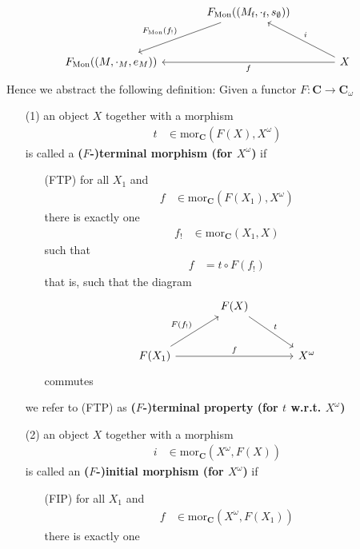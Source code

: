\[
\begin{tikzcd}[sep=large]
  &
  F_{\textrm{Mon}}((M_{\textrm{f}},\cdot_{\textrm{f}},s_{\emptyset}))
  \arrow[swap]{dl}{F_{\textrm{Mon}}(f_{!})}
  &
  \\
  F_{\textrm{Mon}}((M,\cdot_{M},e_{M}))
  &
  &
  X
  \arrow{ll}{f}
  \arrow[swap]{lu}{i}
\end{tikzcd}
\]
Hence we abstract the following definition: Given a functor $F \colon \mathbf{C} \rightarrow \mathbf{C}_{\omega}$
\begin{enumerate}
\item[(1)]
an object $X$ together with a morphism
\begin{align*}
  t
  &\in
  \mathrm{mor}_{\mathbf{C}}(F(X),X^{\omega})
\end{align*}
is called a \textbf{($F$-)terminal morphism (for $X^{\omega}$)} if
\begin{enumerate}
\item[(FTP)]
for all $X_{1}$ and
\begin{align*}
  f
  &\in
  \mathrm{mor}_{\mathbf{C}}(F(X_{1}),X^{\omega})
\end{align*}
there is exactly one
\begin{align*}
  f_{!}
  &\in
  \mathrm{mor}_{\mathbf{C}}(X_{1},X)
\end{align*}
such that
\begin{align*}
  f
  &=
  t
  \circ
  F(f_{!})
\end{align*}
that is, such that the diagram
\[
\begin{tikzcd}[sep=large]
  &
  F(X)
  \arrow{rd}{t}
  &
  \\
  F(X_{1})
  \arrow{ru}{F(f_{!})}
  \arrow{rr}{f}
  &
  &
  X^{\omega}
\end{tikzcd}
\]
commutes
\end{enumerate}
we refer to (FTP) as \textbf{($F$-)terminal property (for $t$ w.r.t. $X^{\omega}$)}
\item[(2)]
an object $X$ together with a morphism
\begin{align*}
  i
  &\in
  \mathrm{mor}_{\mathbf{C}}(X^{\omega},F(X))
\end{align*}
is called an \textbf{($F$-)initial morphism (for $X^{\omega}$)} if
\begin{enumerate}
\item[(FIP)]
for all $X_{1}$ and
\begin{align*}
  f
  &\in
  \mathrm{mor}_{\mathbf{C}}(X^{\omega},F(X_{1}))
\end{align*}
there is exactly one
\begin{align*}

\end{align*}
\end{enumerate}
\end{enumerate}
